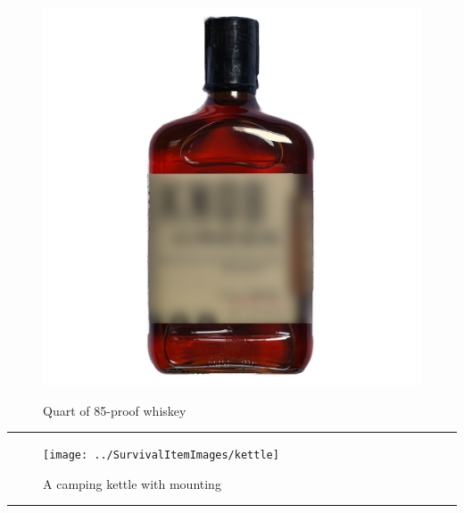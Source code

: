 \documentclass{article}
\begin{document}
    \begin{figure}[H]
        \centering
        \begin{minipage}{0.25\textwidth}
            \centering
            \includegraphics[width=\textwidth]{../SurvivalItemImages/whiskey}
        \end{minipage}\hfill
        \begin{minipage}{0.7\textwidth}
            \centering
            \Large Quart of 85-proof whiskey
        \end{minipage}
    \end{figure}
    \vspace{-0.8em}
    \noindent\rule{\textwidth}{0.4pt}
            
    \begin{figure}[H]
        \centering
        \begin{minipage}{0.25\textwidth}
            \centering
            \texttt{[image: ../SurvivalItemImages/kettle]}
        \end{minipage}\hfill
        \begin{minipage}{0.7\textwidth}
            \centering
            \Large A camping kettle with mounting
        \end{minipage}
    \end{figure}
    \vspace{-0.8em}
    \noindent\rule{\textwidth}{0.4pt}
            
\end{document}
